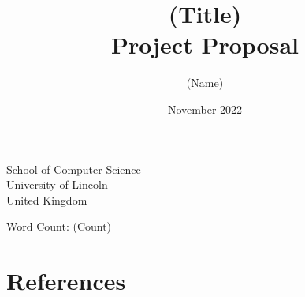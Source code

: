 \documentclass{article}
\title{(Title) \\[1ex] \large Project Proposal}
\author{(Name)}
\date{November 2022}
\begin{document}
\maketitle

\begin{center}
    School of Computer Science\\
    University of Lincoln\\
    United Kingdom

    \vspace{0.8cm}

    Word Count: (Count)
\end{center}

\tableofcontents
\pagebreak








\section{References}
\printbibliography[heading=none]
\end{document}
